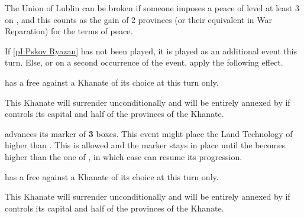 \effetlong
\aparag The Union of Lublin can be broken if someone imposes a peace of level
at least 3 on \POL, and this counts as the gain of 2 provinces (or their
equivalent in War Reparation) for the terms of peace.






\phevnt
\aparag If \ref{pI:Pskov Ryazan} has not been played, it is played as an
additional event this turn.
\aparag Else, or on a second occurrence of the event, apply the following
effect.

\phdipl
\aparag \RUS has a free \CB against a Khanate of its choice at this turn only.

\phpaix
\aparag This Khanate will surrender unconditionally and will be entirely
annexed by \RUS if \RUS controls its capital and half of the provinces of the
Khanate.






\phevnt
\aparag \RUS advances its  marker of {\bf 3}
boxes. This event might place the Land Technology of \RUS higher than
 . This is allowed and the marker stays
in place until the   becomes higher
than the one of \RUS, in which case \RUS can resume its progression.

\phdipl
\aparag \RUS has a free \CB against a Khanate of its choice at this turn only.

\phpaix
\aparag This Khanate will surrender unconditionally and will be entirely
annexed by \RUS if \RUS controls its capital and half of the provinces of the
Khanate.





